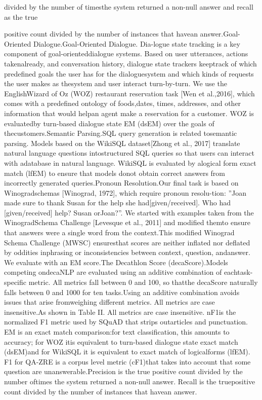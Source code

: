  divided  by  the  number  of  timesthe  system  returned  a  non-null  answer  and  recall  as  the  true

positive  count  divided  by  the  number  of  instances  that  havean answer.Goal-Oriented   Dialogue.Goal-Oriented  Dialogue.  Dia-logue  state  tracking  is  a  key  component  of  goal-orienteddialogue  systems.  Based  on  user  utterances,  actions  takenalready, and conversation history, dialogue state trackers keeptrack of which predefined goals the user has for the dialoguesystem  and  which  kinds  of  requests  the  user  makes  as  thesystem  and  user  interact  turn-by-turn.  We  use  the  EnglishWizard of Oz (WOZ) restaurant reservation task [Wen et al.,2016],  which  comes  with  a  predefined  ontology  of  foods,dates, times, addresses, and other information that would helpan agent make a reservation for a customer. WOZ is evaluatedby turn-based dialogue state EM (dsEM) over the goals of thecustomers.Semantic   Parsing.SQL  query  generation  is  related  tosemantic  parsing.  Models  based  on  the  WikiSQL  dataset[Zhong et al., 2017] translate natural language questions intostructured  SQL  queries  so  that  users  can  interact  with  adatabase  in  natural  language.  WikiSQL  is  evaluated  by  alogical  form  exact  match  (lfEM)  to  ensure  that  models  donot obtain correct answers from incorrectly generated queries.Pronoun  Resolution.Our final task is based on Winogradschemas  [Winograd,  1972],  which  require  pronoun  resolu-tion:  ”Joan  made  sure  to  thank  Susan  for  the  help  she  had[given/received].  Who  had  [given/received]  help?  Susan  orJoan?”.  We  started  with  examples  taken  from  the  WinogradSchema Challenge [Levesque et al., 2011] and modified themto  ensure  that  answers  were  a  single  word  from  the  context.This modified Winograd Schema Challenge (MWSC) ensuresthat  scores  are  neither  inflated  nor  deflated  by  oddities  inphrasing  or  inconsistencies  between  context,  question,  andanswer. We evaluate with an EM score.The  Decathlon  Score  (decaScore).Models  competing  ondecaNLP are evaluated using an additive combination of eachtask-specific metric. All metrics fall between 0 and 100, so thatthe decaScore naturally falls between 0 and 1000 for ten tasks.Using  an  additive  combination  avoids  issues  that  arise  fromweighing different metrics. All metrics are case insensitive.As shown in Table II. All metrics are case insensitive. nF1is  the  normalized  F1  metric  used  by  SQuAD  that  strips  outarticles  and  punctuation.  EM  is  an  exact  match  comparison:for  text  classification,  this  amounts  to  accuracy;  for  WOZ  itis equivalent to turn-based dialogue state exact match (dsEM)and  for  WikiSQL  it  is  equivalent  to  exact  match  of  logicalforms (lfEM). F1 for QA-ZRE is a corpus level metric (cF1)that  takes  into  account  that  some  question  are  unanswerable.Precision is the true positive count divided by the number oftimes the system returned a non-null answer. Recall is the truepositive  count  divided  by  the  number  of  instances  that  havean answer.

